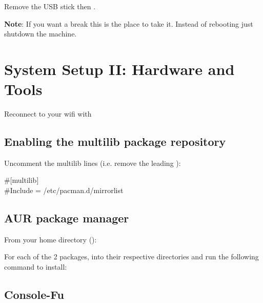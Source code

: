 Remove the USB stick then .

\textbf{Note}: If you want a break this is the place to take it. Instead of rebooting just shutdown the machine.

\section{System Setup II: Hardware and Tools}

Reconnect to your wifi with 

\subsection{Enabling the multilib package repository}

\begin{blocksection}
    Uncomment the multilib lines (i.e. remove the leading \code{\#}):
    \begin{codeblock}
        \#[multilib]\\
        \#Include = /etc/pacman.d/mirrorlist
    \end{codeblock}
\end{blocksection}

\subsection{AUR package manager}

From your home directory ():


For each of the 2 packages,  into their respective directories and run the following command to install:


\subsection{Console-Fu}

